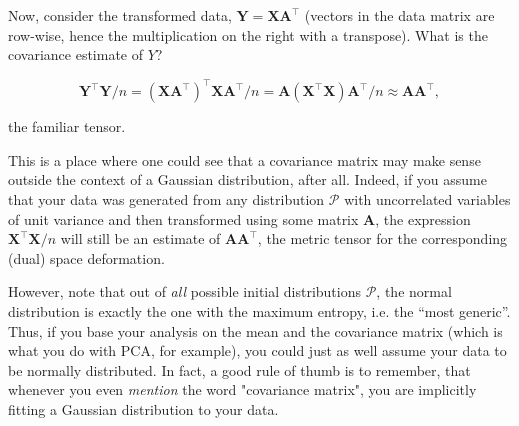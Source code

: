 \documentclass{article}
\begin{document}
Now, consider the transformed data, $\bm{Y} = \bm{X}\bm{A}^{\intercal}$ (vectors in the data matrix are row-wise, hence the multiplication on the right with a transpose). What is the covariance estimate of $Y$?

\begin{equation}
  \bm{Y}^{\intercal}\bm{Y}/n = \left(\bm{X}\bm{A}^{\intercal}\right)^{\intercal}\bm{X}\bm{A}^{\intercal}/n = \bm{A}\left(\bm{X}^{\intercal}\bm{X}\right)\bm{A}^{\intercal}/n \approx \bm{A}\bm{A}^{\intercal},
\end{equation}

the familiar tensor. \medskip

This is a place where one could see that a covariance matrix may make sense outside the context of a Gaussian distribution, after all. Indeed, if you assume that your data was generated from any distribution $\mathcal{P}$ with uncorrelated variables of unit variance and then transformed using some matrix $\bm{A}$, the expression $\bm{X}^{\intercal}\bm{X}/n$ will still be an estimate of $\bm{A}\bm{A}^{\intercal}$, the metric tensor for the corresponding (dual) space deformation.\medskip

However, note that out of \textit{all} possible initial distributions $\mathcal{P}$, the normal distribution is exactly the one with the maximum entropy, i.e. the “most generic”. Thus, if you base your analysis on the mean and the covariance matrix (which is what you do with PCA, for example), you could just as well assume your data to be normally distributed. In fact, a good rule of thumb is to remember, that whenever you even \textit{mention} the word "covariance matrix", you are implicitly fitting a Gaussian distribution to your data.
\end{document}
